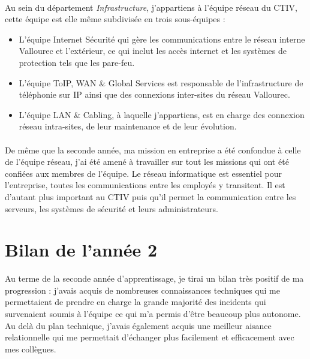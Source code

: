 \documentclass[a4paper,12pt]{report}
\begin{document}
\paragraph{}
Au sein du département \textit{Infrastructure}, j'appartiens à l'équipe réseau du CTIV, cette équipe est elle même subdivisée en trois sous-équipes :
\begin{itemize}
\item L'équipe Internet Sécurité qui gère les communications entre le réseau interne Vallourec et l'extérieur, ce qui inclut les accès internet et les systèmes de protection tels que les pare-feu.
\item L'équipe ToIP, WAN \& Global Services est responsable de l'infrastructure de téléphonie sur IP ainsi que des connexions inter-sites du réseau Vallourec.
\item L'équipe LAN \& Cabling, à laquelle j'appartiens, est en charge des connexion réseau intra-sites, de leur maintenance et de leur évolution.
\end{itemize}

\paragraph{}
De même que la seconde année, ma mission en entreprise a été confondue à celle de l'équipe réseau, j'ai été amené à travailler sur tout les missions qui ont été confiées aux membres de l'équipe. Le réseau informatique est essentiel pour l'entreprise, toutes les communications entre les employés y transitent. Il est d'autant plus important au CTIV puis qu'il permet la communication entre les serveurs, les systèmes de sécurité et leurs administrateurs.

\section{Bilan de l'année 2}
Au terme de la seconde année d'apprentissage, je tirai un bilan très positif de ma progression : j'avais acquis de nombreuses connaissances techniques qui me permettaient de prendre en charge la grande majorité des incidents qui survenaient soumis à l'équipe ce qui m'a permis d'être beaucoup plus autonome. Au delà du plan technique, j'avais également acquis une meilleur aisance relationnelle qui me permettait d'échanger plus facilement et efficacement avec mes collègues.
\end{document}

